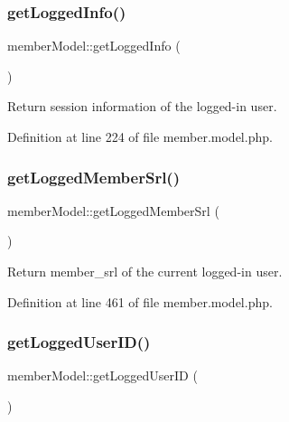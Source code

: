 \subsubsection{\texorpdfstring{get\+Logged\+Info()}{getLoggedInfo()}}
{\footnotesize\ttfamily member\+Model\+::get\+Logged\+Info (\begin{DoxyParamCaption}{ }\end{DoxyParamCaption})}



Return session information of the logged-\/in user. 



Definition at line 224 of file member.\+model.\+php.

\hypertarget{classmemberModel_ae5d9411d53ee2b5fb7e101125db26c1d}{}\label{classmemberModel_ae5d9411d53ee2b5fb7e101125db26c1d} 
\subsubsection{\texorpdfstring{get\+Logged\+Member\+Srl()}{getLoggedMemberSrl()}}
{\footnotesize\ttfamily member\+Model\+::get\+Logged\+Member\+Srl (\begin{DoxyParamCaption}{ }\end{DoxyParamCaption})}



Return member\+\_\+srl of the current logged-\/in user. 



Definition at line 461 of file member.\+model.\+php.

\hypertarget{classmemberModel_a72fc4779b5efef6ff8fc238e85628d01}{}\label{classmemberModel_a72fc4779b5efef6ff8fc238e85628d01} 
\subsubsection{\texorpdfstring{get\+Logged\+User\+I\+D()}{getLoggedUserID()}}
{\footnotesize\ttfamily member\+Model\+::get\+Logged\+User\+ID (\begin{DoxyParamCaption}{ }\end{DoxyParamCaption})}



